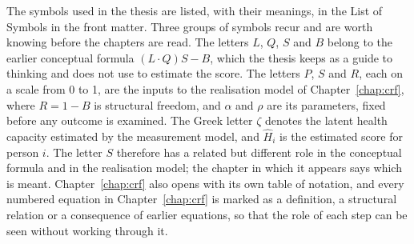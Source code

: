 The symbols used in the thesis are listed, with their meanings, in the List of
Symbols in the front matter. Three groups of symbols recur and are worth
knowing before the chapters are read. The letters $L$, $Q$, $S$ and $B$ belong
to the earlier conceptual formula $(L\cdot Q)S-B$, which the thesis keeps as a
guide to thinking and does not use to estimate the score. The letters $P$, $S$
and $R$, each on a scale from 0 to 1, are the inputs to the realisation model
of Chapter~\ref{chap:crf}, where $R=1-B$ is structural freedom, and $\alpha$
and $\rho$ are its parameters, fixed before any outcome is examined. The Greek
letter $\zeta$ denotes the latent health capacity estimated by the measurement
model, and $\widehat H_i$ is the estimated score for person $i$. The letter $S$
therefore has a related but different role in the conceptual formula and in the
realisation model; the chapter in which it appears says which is meant. Chapter~\ref{chap:crf}
also opens with its own table of notation, and every
numbered equation in Chapter~\ref{chap:crf} is marked as a definition, a
structural relation or a consequence of earlier equations, so that the role of
each step can be seen without working through it.
